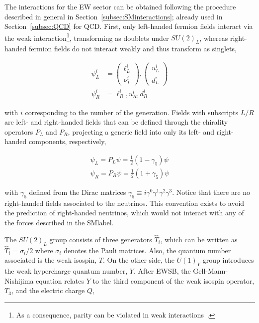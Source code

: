 The interactions for the \acrshort{EW} sector can be obtained following the procedure described in general in Section~\ref{subsec:SMinteractions};
already used in Section~\ref{subsec:QCD} for \acrshort{QCD}. First, only left-handed fermion fields interact via the weak
interaction\footnote{As a consequence, parity can be violated in weak interactions~\cite{Lee,Wu}.},
transforming as doublets under $SU(2)_L$, whereas right-handed fermion fields do not interact weakly and thus transform as singlets,

\begin{equation}
\begin{split}
    \psi_L^i &= \begin{pmatrix}\ell^i_L\\ \nu^i_L \end{pmatrix}, \begin{pmatrix} u^i_L \\ d^i_L \end{pmatrix}\\
    \psi_R^i &= \ell^i_R, u^i_R, d^i_R
\end{split}
\end{equation}

with $i$ corresponding to the number of the generation. Fields with subscripts $L/R$ are left- and right-handed fields that can be defined through the chirality operators $P_L$ and $P_R$, projecting a generic field into only its left- and right-handed components, respectively,

\begin{equation}
    \begin{split}
        \psi_L = P_L\psi = \frac{1}{2}(1-\gamma_5)\psi\\
        \psi_R = P_R\psi = \frac{1}{2}(1+\gamma_5)\psi
    \end{split}
\end{equation}

with $\gamma_5$ defined from the Dirac matrices $\gamma_5\equiv i\gamma^0\gamma^1\gamma^2\gamma^3$. Notice that there are no right-handed fields associated to the neutrinos. This convention exists to avoid the prediction of right-handed neutrinos, which would not interact with any of the forces described in the \acrshort{SMlabel}.

The $SU(2)_L$ group consists of three generators $\hat{T}_i$, which can be written as $\hat{T}_i=\sigma_i/2$ where $\sigma_i$ denotes the Pauli matrices. Also, the quantum number associated is the weak isospin, $T$.
On the other side, the $U(1)_Y$ group introduces the weak hypercharge quantum number, $Y$. After \acrshort{EWSB},
the Gell-Mann-Nishijima equation relates $Y$ to the third component of the weak isospin operator, $T_3$, and the electric charge $Q$,

